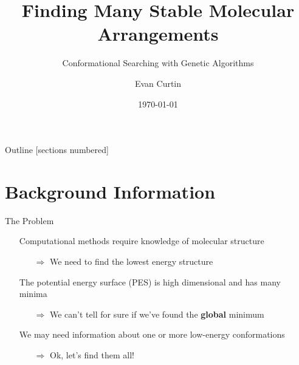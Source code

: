 \documentclass[10pt]{beamer}
\title{Finding Many Stable Molecular Arrangements}
\subtitle{Conformational Searching with Genetic Algorithms}
\date{\today}
\author{Evan Curtin}
\institute{University of Illinois at Urbana-Champaign}
\begin{document}
\maketitle

\begin{frame}{Outline}
  [sections numbered]
  \tableofcontents[hideallsubsections]
\end{frame}

\section{Background Information}

\begin{frame}[fragile]{The Problem}
	\begin{itemize}[<+->]
		\item[] {Computational methods require knowledge of molecular structure}
		\begin{itemize}
			\item[$\Rightarrow$] {We need to find the lowest energy structure}
		\end{itemize}
		\item[] {The potential energy surface (PES) is high dimensional and has many minima}
		\begin{itemize}
			\item[$\Rightarrow$] {We can't tell for sure if we've found the \alert{\textbf{global}} minimum}
		\end{itemize}
		\item[] {We may need information about one or more low-energy conformations}
		\begin{itemize}
			\item[$\Rightarrow$] {Ok, let's find them all!}
		\end{itemize}
	\end{itemize}
\end{frame}
\end{document}
